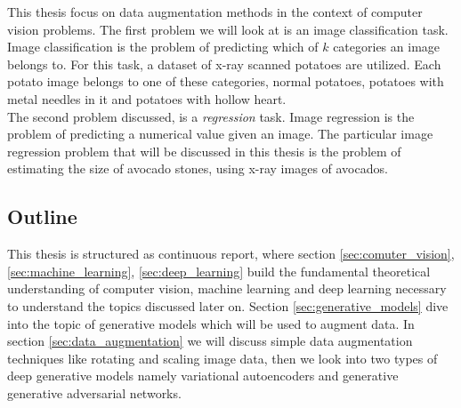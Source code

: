 \documentclass[11pt]{article}
\begin{document}
This thesis focus on data augmentation methods in the context of computer vision problems. The first problem we will look at is an image classification task. Image classification is the problem of predicting which of $k$ categories an image belongs to. For this task, a dataset of x-ray scanned potatoes are utilized. Each potato image belongs to one of these categories, normal potatoes, potatoes with metal needles in it and potatoes with hollow heart.
\\
The second problem discussed, is a \textit{regression} task. Image regression is the problem of predicting a numerical value given an image. The particular image regression problem that will be discussed in this thesis is the problem of estimating the size of avocado stones, using x-ray images of avocados.

\subsection{Outline}

This thesis is structured as continuous report, where section \ref{sec:comuter_vision}, \ref{sec:machine_learning}, \ref{sec:deep_learning} build the fundamental theoretical understanding of computer vision, machine learning and deep learning necessary to understand the topics discussed later on. Section \ref{sec:generative_models} dive into the topic of generative models which will be used to augment data. In section \ref{sec:data_augmentation} we will discuss simple data augmentation techniques like rotating and scaling image data, then we look into two types of deep generative models namely variational autoencoders and generative generative adversarial networks.
\end{document}
